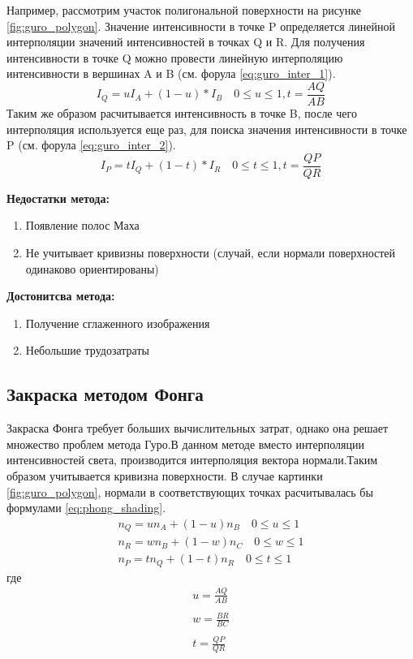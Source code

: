 \documentclass[a4paper,14pt, unknownkeysallowed]{extreport}
\begin{document}
Например, рассмотрим участок полигональной поверхности на рисунке \ref{fig:guro_polygon}.
Значение интенсивности в точке P
определяется линейной интерполяции значений интенсивностей в точках Q и R.
Для получения интенсивности в точке Q можно провести линейную интерполяцию интенсивности в вершинах A и B (см. форула \ref{eq:guro_inter_1}).
\begin{equation} 
	I_Q = uI_A+(1-u)*I_B  \quad 0 \leq u \leq 1, t = \frac{AQ}{AB}
	\label{eq:guro_inter_1}
\end{equation}
Таким же образом расчитывается интенсивность в точке B, после чего интерполяция используется еще раз, для поиска значения интенсивности в точке P 
(см. форула \ref{eq:guro_inter_2}). \cite{Rodgers}
\begin{equation} 
	I_P = tI_Q+(1-t)*I_R  \quad 0 \leq t \leq 1, t = \frac{QP}{QR}
	\label{eq:guro_inter_2}
\end{equation}

\textbf{Недостатки метода:}
\begin{enumerate}
	\item Появление полос Маха 
	\item Не учитывает кривизны поверхности (случай, если нормали поверхностей одинаково ориентированы)
\end{enumerate}

\textbf{Достонитсва метода:}
\begin{enumerate}
	\item Получение сглаженного изображения
	\item Небольшие трудозатраты
\end{enumerate}


\subsection{Закраска методом Фонга}
Закраска Фонга требует больших вычислительных затрат, однако она решает множество проблем метода Гуро.В данном методе вместо интерполяции интенсивностей света,
производится интерполяция вектора нормали.Таким образом учитывается кривизна поверхности.
В случае картинки \ref{fig:guro_polygon}, нормали в соответствующих точках расчитывалась бы формулами \ref{eq:phong_shading}. \cite{Rodgers}
\begin{equation}
	\label{eq:phong_shading}
	\begin{aligned}
	n_Q = un_A + (1-u)n_B  \quad 0 \leq u \leq 1 \\
	n_R = wn_B + (1-w)n_C  \quad 0 \leq w \leq 1 \\
	n_P = tn_Q + (1-t)n_R  \quad 0 \leq t \leq 1 
	\end{aligned}
\end{equation}
где
\begin{equation}
	\begin{aligned}
	u = \frac{AQ}{AB} \\\\
	w = \frac{BR}{BC} \\\\
	t = \frac{QP}{QR} \\\\
	\end{aligned}
\end{equation}
\end{document}
